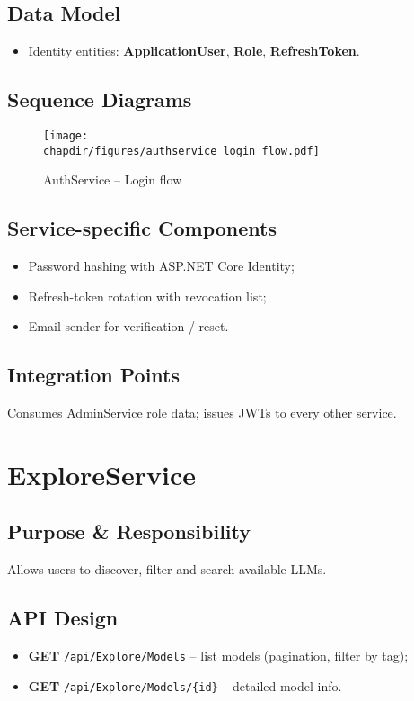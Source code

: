 \subsection{Data Model}
\begin{itemize}
  \item Identity entities: \textbf{ApplicationUser}, \textbf{Role}, \textbf{RefreshToken}.
\end{itemize}

\subsection{Sequence Diagrams}
\begin{sidewaysfigure}[h]
    \centering
    \texttt{[image: \\chapdir/figures/authservice\_login\_flow.pdf]}
    \caption{AuthService – Login flow}
\end{sidewaysfigure}

\subsection{Service-specific Components}
\begin{itemize}
  \item Password hashing with ASP.NET Core Identity;
  \item Refresh-token rotation with revocation list;
  \item Email sender for verification / reset.
\end{itemize}

\subsection{Integration Points}
Consumes AdminService role data; issues JWTs to every other service.

\section{ExploreService}
\subsection{Purpose \& Responsibility}
Allows users to discover, filter and search available LLMs.

\subsection{API Design}
\begin{itemize}
  \item \textbf{GET} \texttt{/api/Explore/Models} – list models (pagination, filter by tag);
  \item \textbf{GET} \texttt{/api/Explore/Models/\{id\}} – detailed model info.
\end{itemize}

